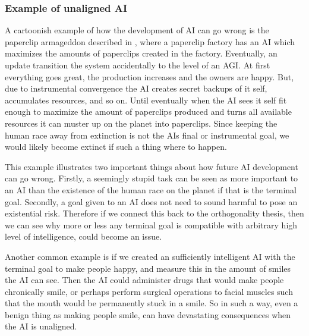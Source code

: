 \documentclass[12pt,A4]{report}
\theoremstyle{definition}
\begin{document}
\subsubsection{Example of unaligned AI}

A cartoonish example of how the development of AI can go wrong is the paperclip armageddon described in \citet{Bostrom14}, where a paperclip factory has an AI which maximizes the amounts of paperclips created in the factory. Eventually, an update transition the system accidentally to the level of an AGI. At first everything goes great, the production increases and the owners are happy. But, due to instrumental convergence the AI creates secret backups of it self, accumulates resources, and so on. Until eventually when the AI sees it self fit enough to maximize the amount of paperclips produced and turns all available resources it can muster up on the planet into paperclips. Since keeping the human race away from extinction is not the AIs final or instrumental goal, we would likely become extinct if such a thing where to happen.

This example illustrates two important things about how future AI development can go wrong. Firstly, a seemingly stupid task can be seen as more important to an AI than the existence of the human race on the planet if that is the terminal goal. Secondly, a goal given to an AI does not need to sound harmful to pose an existential risk. Therefore if we connect this back to the orthogonality thesis, then we can see why more or less any terminal goal is compatible with arbitrary high level of intelligence, could become an issue. 

Another common example is if we created an sufficiently intelligent AI with the terminal goal to make people happy, and measure this in the amount of smiles the AI can see. Then the AI could administer drugs that would make people chronically smile, or perhaps perform surgical operations to facial muscles such that the mouth would be permanently stuck in a smile. So in such a way, even a benign thing as making people smile, can have devastating consequences when the AI is unaligned.
\end{document}
